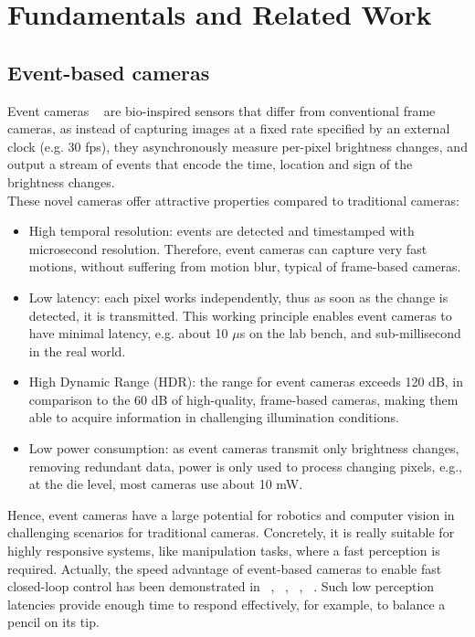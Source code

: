 \cleardoublepage\chapter{Fundamentals and Related Work}\label{sec:sota}

\section{Event-based cameras}

Event cameras ~\cite{gallego2020} are bio-inspired sensors that differ from conventional frame cameras, as instead of capturing images at a fixed rate specified by an external clock (e.g. 30 fps), they asynchronously measure per-pixel brightness changes, and output a stream of events that encode the time, location and sign of the brightness changes.\\

These novel cameras offer attractive properties compared to traditional cameras:

\begin{itemize}
	\item High temporal resolution: events are detected and timestamped with microsecond resolution. Therefore, event cameras can capture very fast motions, without suffering from motion blur, typical of frame-based cameras.
	\item Low latency: each pixel works independently, thus as soon as the change is detected, it is transmitted. This working principle enables event cameras to have minimal latency, e.g. about 10 $\mu$s on the lab bench, and sub-millisecond in the real world.
	\item High Dynamic Range (HDR): the range for event cameras exceeds 120 dB, in comparison to the 60 dB of high-quality, frame-based cameras, making them able to acquire information in challenging illumination conditions.
	\item Low power consumption: as event cameras transmit only brightness changes, removing redundant data, power is only used to process changing pixels, e.g., at the die level, most cameras use about 10 mW.
\end{itemize}

Hence, event cameras have a large potential for robotics and computer vision in challenging scenarios for traditional cameras. Concretely, it is really suitable for highly responsive systems, like manipulation tasks, where a fast perception is required. Actually, the speed advantage of event-based cameras to enable fast closed-loop control has been demonstrated in ~\cite{CL1}, ~\cite{CL2}, ~\cite{CL3}, ~\cite{CL4}. Such low perception latencies provide enough time to respond effectively, for example, to balance a pencil on its tip.\\

